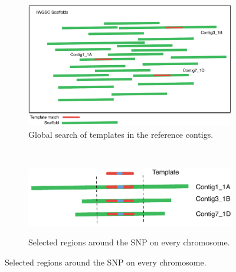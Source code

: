 \begin{figure}
    \begin{subfigure}[b]{0.4\textwidth}
        \includegraphics[width=1\textwidth]{PolyMarker/Figures/aln/scaffoldsSearch.pdf}
        \caption{Global search of templates in the reference contigs.}
        \label{fig:poly:globalSearch}
    \end{subfigure}
    ~ %
    \begin{subfigure}[b]{0.4\textwidth}
        \raisebox{10mm} { \includegraphics[width=1\textwidth]{PolyMarker/Figures/aln/scaffoldsFoundAround.pdf} }
        \caption{Selected regions around the SNP on every chromosome.}
        \label{fig:poly:globalAround} 
    \end{subfigure}
    

\end{figure}
